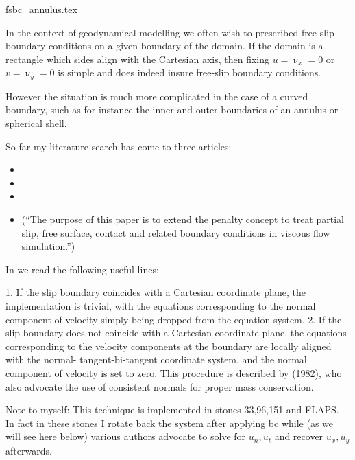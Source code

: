 \begin{flushright} {\tiny {\color{gray} fsbc\_annulus.tex}} \end{flushright}


In the context of geodynamical modelling we often wish to prescribed free-slip 
boundary conditions on a given boundary of the domain. If the domain is a rectangle
which sides align with the Cartesian axis, then fixing $u=\upnu_x=0$ or $v=\upnu_y=0$
is simple and does indeed insure free-slip boundary conditions. 

However the situation is much more complicated in the case of a curved boundary, 
such as for instance the inner and outer boundaries of an annulus or spherical shell.

So far my literature search has come to three articles:

\begin{itemize}
\item {}
\item {}
\item {}
\item {} (``The purpose of this paper is to extend the penalty concept to treat partial slip, free surface,
contact and related boundary conditions in viscous flow simulation.'')
\end{itemize}

In \textcite{behr04} we read the following useful lines:
\begin{displayquote}
{\color{darkgray}
1. If the slip boundary coincides with a Cartesian coordinate plane, the implementation is trivial,
with the equations corresponding to the normal component of velocity simply being dropped
from the equation system.
2. If the slip boundary does not coincide with a Cartesian coordinate plane, the equations
corresponding to the velocity components at the boundary are locally aligned with the normal-
tangent-bi-tangent coordinate system, and the normal component of velocity is set to zero.
This procedure is described by \textcite{ensg82} (1982), who also advocate the use of consistent
normals for proper mass conservation.}
\end{displayquote}

Note to myself: This technique is implemented in stones 33,96,151 and FLAPS.
In fact in these stones I rotate back the system after applying bc while 
(as we will see here below) various authors advocate to solve for $u_n,u_t$ and recover 
$u_x,u_y$ afterwards.

